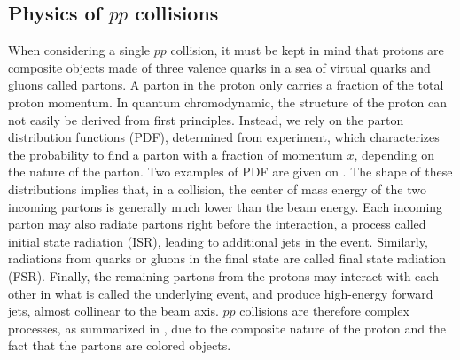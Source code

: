         \subsection{Physics of $pp$ collisions \label{sec:physicsFromCollisionsAtTheLHC}}

    When considering a single $pp$ collision, it must be kept in mind that protons are
    composite objects made of three valence quarks in a sea of virtual quarks and gluons
    called partons. A parton in the proton only carries a fraction
    of the total proton momentum. In quantum chromodynamic, the
    structure of the proton can not easily be derived from first principles.
    Instead, we rely on the parton distribution functions (PDF), determined
    from experiment, which characterizes the probability to find a parton with a fraction of
    momentum $x$, depending on the nature of the parton. Two examples of PDF are given on
    . The shape of these
    distributions implies that, in a collision, the center of mass energy of the two incoming
    partons is generally much lower than the beam energy.  Each incoming parton may also
    radiate partons right before the interaction, a process called initial state radiation
    (ISR), leading to additional jets in the event. Similarly, radiations from quarks or
    gluons in the final state are called final state radiation (FSR). Finally, the remaining
    partons from the protons may interact with each other in what is called the underlying
    event, and produce high-energy forward jets, almost collinear to the beam axis. $pp$
    collisions are therefore complex processes, as summarized in ,
    due to the composite nature of the proton and the fact that the partons are colored
    objects.



